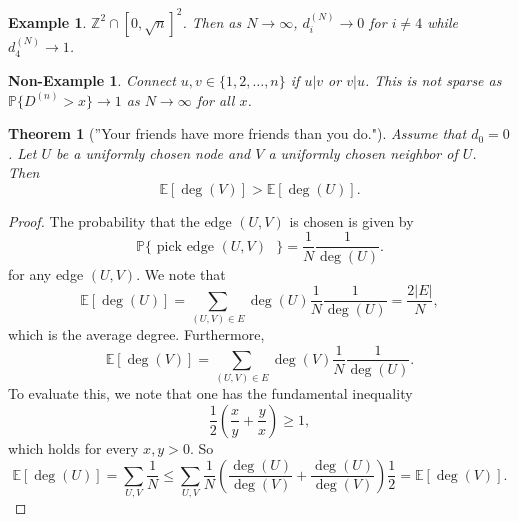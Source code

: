 \documentclass[12pt]{article}
\theoremstyle{plain}
\newtheorem*{theorem*}{Theorem}
\newtheorem*{example*}{Example}
\newtheorem*{nonexample*}{Non-Example}
\begin{document}
\begin{example*}
$\mathbb{Z}^2 \cap [0,\sqrt{n}]^2$. Then as $N \rightarrow \infty$, $d_i^{(N)} \rightarrow 0$ for $i \neq 4$ while $d_4^{(N)} \rightarrow 1$.
\end{example*}

\begin{nonexample*}
Connect $u,v \in \{1,2,\ldots,n\}$ if $u|v$ or $v|u$. This is not sparse as $\mathbb{P}\{D^{(n)} > x\} \rightarrow 1$ as $N \rightarrow \infty$ for all $x$.
\end{nonexample*}

\begin{theorem*}[''Your friends have more friends than you do."] Assume that $d_0 = 0$. Let $U$ be a uniformly chosen node and $V$ a uniformly chosen neighbor of $U$. Then
\[
\mathbb{E}[\deg(V)] > \mathbb{E}[\deg(U)].
\]
\end{theorem*}
\begin{proof}
The probability that the edge $(U,V)$ is chosen is given by
\[
\mathbb{P}\{\text{ pick edge $(U,V)$ }\} = \frac{1}{N} \frac{1}{\deg(U)}.
\]
for any edge $(U,V)$. We note that
\[
\mathbb{E}[\deg(U)] = \sum_{(U,V) \in E} \deg(U) \frac{1}{N} \frac{1}{\deg(U)} = \frac{2|E|}{N},
\]
which is the average degree. Furthermore,
\[
\mathbb{E}[\deg(V)] = \sum_{(U,V) \in E} \deg(V) \frac{1}{N} \frac{1}{\deg(U)}.
\]
To evaluate this, we note that one has the fundamental inequality
\[
\frac{1}{2}\left(\frac{x}{y} + \frac{y}{x}\right) \geq 1,
\]
which holds for every $x,y > 0$. So
\[
\mathbb{E}[\deg(U)] = \sum_{U,V} \frac{1}{N} \leq \sum_{U,V} \frac{1}{N} \left(\frac{\deg(U)}{\deg(V)} + \frac{\deg(U)}{\deg(V)} \right) \frac{1}{2} = \mathbb{E}[\deg(V)].
\]
\end{proof}
\end{document}
